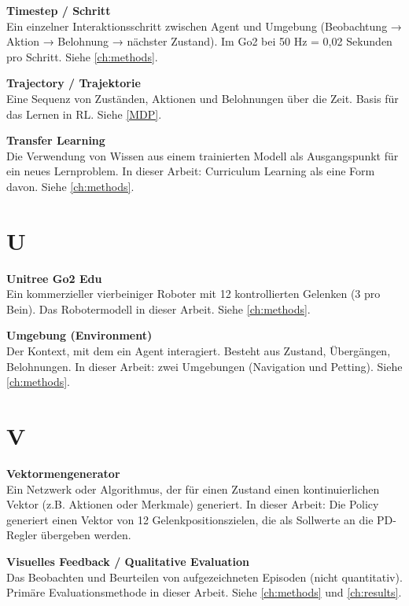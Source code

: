 \vspace{0.5cm}
\noindent\textbf{Timestep / Schritt} \\
Ein einzelner Interaktionsschritt zwischen Agent und Umgebung (Beobachtung → Aktion → Belohnung → nächster Zustand). Im Go2 bei 50 Hz = 0,02 Sekunden pro Schritt. Siehe \autoref{ch:methods}.

\vspace{0.5cm}
\noindent\textbf{Trajectory / Trajektorie} \\
Eine Sequenz von Zuständen, Aktionen und Belohnungen über die Zeit. Basis für das Lernen in RL. Siehe \autoref{MDP}.

\vspace{0.5cm}
\noindent\textbf{Transfer Learning} \\
Die Verwendung von Wissen aus einem trainierten Modell als Ausgangspunkt für ein neues Lernproblem. In dieser Arbeit: Curriculum Learning als eine Form davon. Siehe \autoref{ch:methods}.

\section*{U}

\vspace{0.3cm}
\noindent\textbf{Unitree Go2 Edu} \\
Ein kommerzieller vierbeiniger Roboter mit 12 kontrollierten Gelenken (3 pro Bein). Das Robotermodell in dieser Arbeit. Siehe \autoref{ch:methods}.

\vspace{0.5cm}
\noindent\textbf{Umgebung (Environment)} \\
Der Kontext, mit dem ein Agent interagiert. Besteht aus Zustand, Übergängen, Belohnungen. In dieser Arbeit: zwei Umgebungen (Navigation und Petting). Siehe \autoref{ch:methods}.

\section*{V}

\vspace{0.3cm}
\noindent\textbf{Vektormengenerator} \\
Ein Netzwerk oder Algorithmus, der für einen Zustand einen kontinuierlichen Vektor (z.B. Aktionen oder Merkmale) generiert. In dieser Arbeit: Die Policy generiert einen Vektor von 12 Gelenkpositionszielen, die als Sollwerte an die PD-Regler übergeben werden.

\vspace{0.5cm}
\noindent\textbf{Visuelles Feedback / Qualitative Evaluation} \\
Das Beobachten und Beurteilen von aufgezeichneten Episoden (nicht quantitativ). Primäre Evaluationsmethode in dieser Arbeit. Siehe \autoref{ch:methods} und \autoref{ch:results}.

